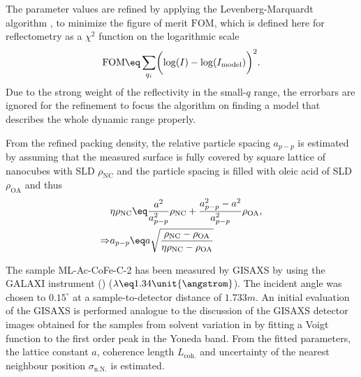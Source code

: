 \documentclass[\main/dresen_thesis.tex]{subfiles}
\begin{document}
    The parameter values are refined by applying the Levenberg-Marquardt algorithm \cite{Marquardt_1963_Analgo}, to minimize the figure of merit $\mathrm{FOM}$, which is defined here for reflectometry as a $\chi^2$ function on the logarithmic scale
    \begin{align}
      \mathrm{FOM} \eq \sum_{q_i} \biggl( \log(I) - \log(I_\mathrm{model})\biggr)^2.
    \end{align}
    Due to the strong weight of the reflectivity in the small-$q$ range, the errorbars are ignored for the refinement to focus the algorithm on finding a model that describes the whole dynamic range properly.

    From the refined packing density, the relative particle spacing $a_{p-p}$ is estimated by assuming that the measured surface is fully covered by square lattice of nanocubes with SLD $\rho_\mathrm{NC}$ and the particle spacing is filled with oleic acid of SLD $\rho_\mathrm{OA}$ and thus
    \begin{align}
      \label{eq:monolayers:characterization:particleSpacing}
      \begin{split}
        &\eta \rho_\mathrm{NC}  \eq \frac{a^2}{a_{p-p}^2} \rho_\mathrm{NC} + \frac{a_{p-p}^2 - a^2}{a_{p-p}^2} \rho_\mathrm{OA},\\
        \Rightarrow& a_{p-p} \eq a \sqrt {\frac{\rho_\mathrm{NC} - \rho_\mathrm{OA} }{\eta \rho_\mathrm{NC} - \rho_\mathrm{OA}}}
      \end{split}
    \end{align}

      The sample ML-Ac-CoFe-C-2 has been measured by GISAXS by using the GALAXI instrument () ($\lambda \eq 1.34 \unit{\angstrom}$).
      The incident angle was chosen to $0.15 ^\circ$ at a sample-to-detector distance of $1.733 \unit{m}$.
      An initial evaluation of the GISAXS is performed analogue to the discussion of the GISAXS detector images obtained for the samples from solvent variation in  by fitting a Voigt function to the first order peak in the Yoneda band.
      From the fitted parameters, the lattice constant $a$, coherence length $L_\mathrm{coh.}$ and uncertainty of the nearest neighbour position $\sigma_\mathrm{n.N.}$ is estimated.
\end{document}
